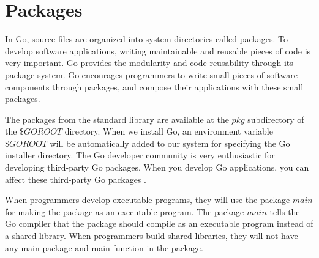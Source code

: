 \documentclass[
  digital, %
  notable,   %
  lof,     %
  lot,     %
]{fithesis3}
\begin{document}

\section{Packages}
In Go, source files are organized into system directories called packages. To  develop 
software applications, writing maintainable and reusable pieces of code is very important. Go 
provides the modularity and code reusability through its package system. Go encourages 
programmers to write small pieces of software components through packages, and compose their  
applications with these small packages.

The packages from the standard library are available at the $pkg$ subdirectory of the $\$GOROOT$ 
directory. When we install Go, an environment variable $\$GOROOT$ will be automatically added to 
our system for specifying the Go installer directory. The Go developer community is very 
enthusiastic for developing third-party Go packages. When you develop Go applications, you can 
affect these third-party Go packages \cite{stack_2014}.

When programmers develop executable programs, they will use the package $main$ for making the 
package as an executable program. The package $main$ tells the Go compiler that the package 
should compile as an executable program instead of a shared library. When programmers build 
shared libraries, they will not have any main package and main function in the package.
\end{document}
